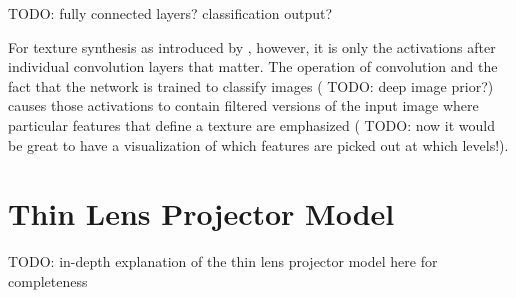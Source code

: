 {\color{red} TODO: fully connected layers? classification output?}

For texture synthesis as introduced by \citet{Gatys2015}, however, it is only the activations after individual convolution layers that matter. The operation of convolution and the fact that the network is trained to classify images ({\color{red} TODO: deep image prior?}) causes those activations to contain filtered versions of the input image where particular features that define a texture are emphasized ({\color{red} TODO: now it would be great to have a visualization of which features are picked out at which levels!}).

\chapter{Thin Lens Projector Model}
\label{chapter:appendix-projector}

{\color{red} TODO: in-depth explanation of the thin lens projector model here for completeness}
